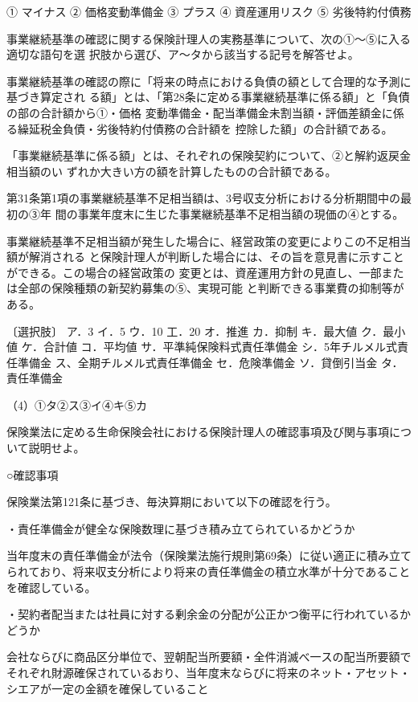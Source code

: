 \documentclass[report,gutter=10mm,fore-edge=10mm,uplatex,dvipdfmx]{jlreq}
\begin{document}
\answer{}
① マイナス ② 価格変動準備金 ③ プラス ④ 資産運用リスク ⑤ 劣後特約付債務

事業継続基準の確認に関する保険計理人の実務基準について、次の①〜⑤に入る適切な語句を選
択肢から選び、ア〜タから該当する記号を解答せよ。

事業継続基準の確認の際に「将来の時点における負債の額として合理的な予測に基づき算定され
る額」とは、「第28条に定める事業継続基準に係る額」と「負債の部の合計額から①・価格
変動準備金・配当準備金未割当額・評価差額金に係る繰延税金負債・劣後特約付債務の合計額を
控除した額」の合計額である。

「事業継続基準に係る額」とは、それぞれの保険契約について、②と解約返戻金相当額のい
ずれか大きい方の額を計算したものの合計額である。

第31条第1項の事業継続基準不足相当額は、3号収支分析における分析期間中の最初の③年
間の事業年度末に生じた事業継続基準不足相当額の現価の④とする。

事業継続基準不足相当額が発生した場合に、経営政策の変更によりこの不足相当額が解消される
と保険計理人が判断した場合には、その旨を意見書に示すことができる。この場合の経営政策の
変更とは、資産運用方針の見直し、一部または全部の保険種類の新契約募集の⑤、実現可能
と判断できる事業費の抑制等がある。

〔選択肢〕
ア．3
イ．5
ウ．10
工．20
オ．推進
カ．抑制
キ．最大値
ク．最小値
ケ．合計値
コ．平均値
サ．平準純保険料式責任準備金
シ．5年チルメル式責任準備金
ス、全期チルメル式責任準備金
セ．危険準備金
ソ．貸倒引当金
タ．責任準備金

\answer{}
（4）①タ②ス③イ④キ⑤カ

保険業法に定める生命保険会社における保険計理人の確認事項及び関与事項について説明せよ。

\answer{}
○確認事項

保険業法第121条に基づき、毎決算期において以下の確認を行う。

・責任準備金が健全な保険数理に基づき積み立てられているかどうか

当年度末の責任準備金が法令（保険業法施行規則第69条）に従い適正に積み立てられており、将来収支分析により将来の責任準備金の積立水準が十分であることを確認している。

・契約者配当または社員に対する剰余金の分配が公正かつ衡平に行われているかどうか

会社ならびに商品区分単位で、翌朝配当所要額・全件消滅べ一スの配当所要額でそれぞれ財源確保されているおり、当年度末ならびに将来のネット・アセット・シエアが一定の金額を確保していること
\end{document}
